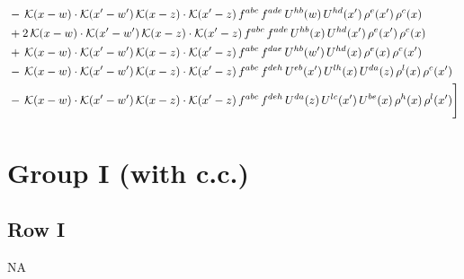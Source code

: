 \documentclass[9pt]{article}
\numberwithin{equation}{section}
\begin{document}
\begin{align}
&-\,\mathcal{K}(x-w)\cdot\mathcal{K}(x'-w')\,\mathcal{K}(x-z)\cdot\mathcal{K}(x'-z)\,f^{abc}\,f^{ade}\,U^{hb}(w)\,U^{hd}(x')\,\rho^{e}(x')\,\rho^{c}(x)\notag\\
&+2\,\mathcal{K}(x-w)\cdot\mathcal{K}(x'-w')\,\mathcal{K}(x-z)\cdot\mathcal{K}(x'-z)\,f^{abc}\,f^{ade}\,U^{hb}(x)\,U^{hd}(x')\,\rho^{e}(x')\,\rho^{c}(x)\notag\\
&+\,\mathcal{K}(x-w)\cdot\mathcal{K}(x'-w')\,\mathcal{K}(x-z)\cdot\mathcal{K}(x'-z)\,f^{abc}\,f^{dae}\,U^{hb}(w')\,U^{hd}(x)\,\rho^{e}(x)\,\rho^{c}(x')\notag\\
&-\,\mathcal{K}(x-w)\cdot\mathcal{K}(x'-w')\,\mathcal{K}(x-z)\cdot\mathcal{K}(x'-z)\,f^{abc}\,f^{deh}\,U^{eb}(x')\,U^{lh}(x)\,U^{da}(z)\,\rho^{l}(x)\,\rho^{c}(x')\notag\\
&-\,\mathcal{K}(x-w)\cdot\mathcal{K}(x'-w')\,\mathcal{K}(x-z)\cdot\mathcal{K}(x'-z)\,f^{abc}\,f^{deh}\,U^{da}(z)\,U^{lc}(x')\,U^{be}(x)\,\rho^{h}(x)\,\rho^{l}(x')\Bigg]
\end{align}
\section{Group I (with c.c.)}
\subsection{Row I}
\textsc{NA}
\end{document}
